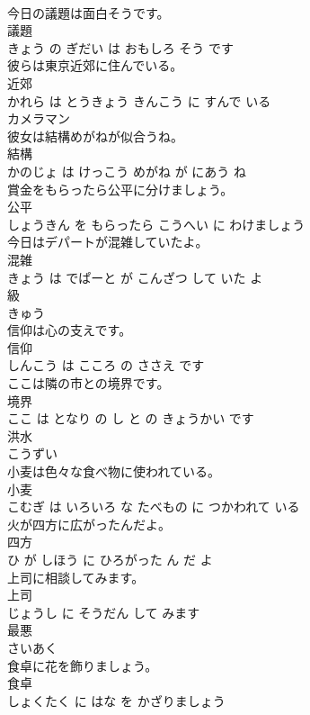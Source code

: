 \documentclass[8pt]{extreport}
\begin{document}
\begin{CJK}{UTF8}{min}
\\	今日の議題は面白そうです。	
\\	議題 
\\	きょう の ぎだい は おもしろ そう です			
\\	彼らは東京近郊に住んでいる。	
\\	近郊 
\\	かれら は とうきょう きんこう に すんで いる			
\\	カメラマン	
\\	彼女は結構めがねが似合うね。	
\\	結構 
\\	かのじょ は けっこう めがね が にあう ね			
\\	賞金をもらったら公平に分けましょう。	
\\	公平 
\\	しょうきん を もらったら こうへい に わけましょう			
\\	今日はデパートが混雑していたよ。	
\\	混雑 
\\	きょう は でぱーと が こんざつ して いた よ			
\\	級	
\\	きゅう			
\\	信仰は心の支えです。	
\\	信仰 
\\	しんこう は こころ の ささえ です			
\\	ここは隣の市との境界です。	
\\	境界 
\\	ここ は となり の し と の きょうかい です			
\\	洪水	
\\	こうずい			
\\	小麦は色々な食べ物に使われている。	
\\	小麦 
\\	こむぎ は いろいろ な たべもの に つかわれて いる			
\\	火が四方に広がったんだよ。	
\\	四方 
\\	ひ が しほう に ひろがった ん だ よ			
\\	上司に相談してみます。	
\\	上司 
\\	じょうし に そうだん して みます			
\\	最悪	
\\	さいあく			
\\	食卓に花を飾りましょう。	
\\	食卓 
\\	しょくたく に はな を かざりましょう			

\end{CJK}
\end{document}
